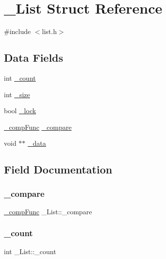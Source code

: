 \hypertarget{struct__List}{}\section{\+\_\+\+List Struct Reference}
\label{struct__List}


{\ttfamily \#include $<$list.\+h$>$}

\subsection*{Data Fields}
\begin{DoxyCompactItemize}
\item 
int \mbox{\hyperlink{struct__List_afcc6effbeea05019d64a0fdcb99ebf9c}{\+\_\+count}}
\item 
int \mbox{\hyperlink{struct__List_acccc526abfc4d69b37bb167adc029107}{\+\_\+size}}
\item 
bool \mbox{\hyperlink{struct__List_aa424250bd616a9439c83b2521d13c242}{\+\_\+lock}}
\item 
\mbox{\hyperlink{list_8h_a635855f2315417070aa4dbae27b6e4a6}{\+\_\+comp\+Func}} \mbox{\hyperlink{struct__List_a79d2aa2126fed5346e46f58444872bf5}{\+\_\+compare}}
\item 
void $\ast$$\ast$ \mbox{\hyperlink{struct__List_a6dc233faef712458daa3667ba09cfcbf}{\+\_\+data}}
\end{DoxyCompactItemize}


\subsection{Field Documentation}
\mbox{\label{struct__List_a79d2aa2126fed5346e46f58444872bf5}} 
\subsubsection{\texorpdfstring{\+\_\+compare}{\_compare}}
{\footnotesize\ttfamily \mbox{\hyperlink{list_8h_a635855f2315417070aa4dbae27b6e4a6}{\+\_\+comp\+Func}} \+\_\+\+List\+::\+\_\+compare}

\mbox{\label{struct__List_afcc6effbeea05019d64a0fdcb99ebf9c}} 
\subsubsection{\texorpdfstring{\+\_\+count}{\_count}}
{\footnotesize\ttfamily int \+\_\+\+List\+::\+\_\+count}

